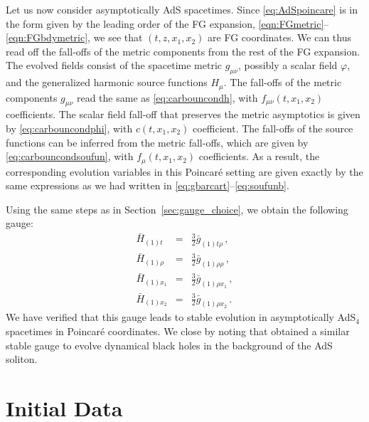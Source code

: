 \documentclass[aps,letterpaper,twocolumn,nofootinbib]{revtex4}
\numberwithin{equation}{section}
\begin{document}
Let us now consider asymptotically AdS spacetimes.
Since \eqref{eq:AdSpoincare} is in the form given by the leading order of the FG expansion, \eqref{eqn:FGmetric}--\eqref{eqn:FGbdymetric}, we see that $(t,z,x_1,x_2)$ are FG coordinates.
We can thus read off the fall-offs of the metric components from the rest of the FG expansion.
The evolved fields consist of the spacetime metric $g_{\mu\nu}$, possibly a scalar field $\varphi$, and the generalized harmonic source functions $H_\mu$.
The fall-offs of the metric components $g_{\mu\nu}$ read the same as \eqref{eq:carbouncondh}, with $f_{\mu\nu}(t,x_1,x_2)$ coefficients.
The scalar field fall-off that preserves the metric asymptotics is given by \eqref{eq:carbouncondphi}, with $c(t,x_1,x_2)$ coefficient.
The fall-offs of the source functions can be inferred from the metric fall-offs, which are given by \eqref{eq:carbouncondsoufun}, with $f_{\mu}(t,x_1,x_2)$ coefficients.
As a result, the corresponding evolution variables in this Poincar\'e setting are given exactly by the same expressions as we had written in \eqref{eq:gbarcart}--\eqref{eq:soufunb}.

Using the same steps as in Section~\ref{sec:gauge_choice}, we obtain the following gauge:
\begin{eqnarray}
\label{eq:hbold_poincare}
\bar{H}_{(1)t}&=&\frac{3}{2} \bar{g}_{(1)\text{$t$$\rho $}}\,, \nonumber\\
\bar{H}_{(1)\rho}&=&\frac{3}{2} \bar{g}_{(1) \rho \rho }\,,\nonumber\\
\bar{H}_{(1)x_1}&=&\frac{3}{2} \bar{g}_{(1) \rho x_1 }\,,\nonumber\\
\bar{H}_{(1)x_2}&=&\frac{3}{2} \bar{g}_{(1) \rho x_2 }\,.
\end{eqnarray}
We have verified that this gauge leads to stable evolution in asymptotically AdS$_4$ spacetimes in Poincar\'e coordinates. 
We close by noting that \cite{Bantilan:2020pay} obtained a similar stable gauge to evolve dynamical black holes in the background of the AdS soliton. 


\section{Initial Data}
\label{sec:initdata}
\end{document}
